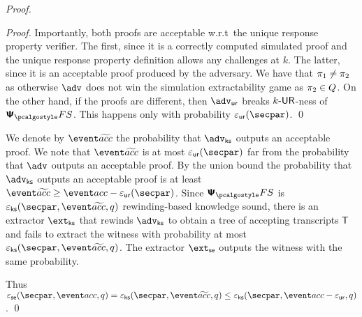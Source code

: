 \begin{proof}
\begin{proof}
	Importantly, both proofs are acceptable w.r.t~the unique response property verifier. The first, since it is a correctly computed simulated proof and the unique response property definition allows any challenges at $k$. The latter, since it is an acceptable proof produced by the adversary.
	We have that $\pi_1 \neq \pi_2$ as otherwise $\advse$ does not win the simulation extractability game as $\pi_2 \in Q$. On the other hand, if the proofs are different, then $\advur$ breaks ${k\text{-}\mathsf{UR}}$-ness of $\psfs$. This happens only with  probability $\epsur(\secpar)$. 
	\qed
	\end{proof}

	We denote by $\waccProb$ the probability that $\advcss$ outputs an acceptable proof. We note that $\waccProb$ is at most $\epsur (\secpar)$ far from the probability that $\advse$ outputs an acceptable proof. By the union bound the probability that $\advcss$ outputs an acceptable proof is at least $\waccProb \geq \accProb - \epsur (\secpar)$. %
%
	Since $\psfs$ is $\epscss (\secpar, \waccProb,q)$ rewinding-based knowledge sound, there is an extractor $\extcss$ that rewinds $\advcss$ to obtain a tree of accepting transcripts $\mathsf{T}$ and fails to extract the witness with probability at most $\epscss (\secpar, \waccProb, q)$. The extractor $\extse$ outputs the witness with the same probability.

%
	Thus $\epsse(\secpar,\accProb,q) = \epscss (\secpar, \waccProb,q) \leq \epscss(\secpar,\accProb - \epsur,q)$.
	\qed
	\end{proof}


